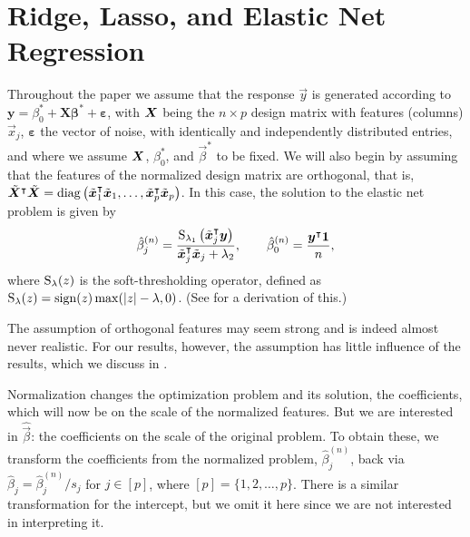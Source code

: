 \section{Ridge, Lasso, and Elastic Net Regression}%
\label{sec:theory}

Throughout the paper we assume that the response \(\vec{y}\) is generated according to
\(\bm{y} = \beta_0^* + \bm{X\beta}^* + \bm{\varepsilon}\), with \(\bm X\) being the \(n
\times p\) design matrix with features (columns) \(\vec x_j\), \(\bm{\varepsilon}\) the
vector of noise, with identically and independently distributed entries, and where we
assume \(\bm{X}\), \(\beta_0^*\), and \(\vec{\beta}^*\) to be fixed. We will also begin by
assuming that the features of the normalized design matrix are orthogonal, that is,
\(\tilde{\bm{X}}^\intercal \tilde{\bm{X}} = \operatorname{diag}\left(\tilde{\bm{x}}_1^\intercal
\tilde{\bm{x}}_1, \dots, \tilde{\bm{x}}_p^\intercal \tilde{\bm{x}}_p\right)\). In this
case, the solution to the elastic net problem is given by
%
\begin{equation}
  \label{eq:orthogonal-solution-normalized}
  \hat{\beta}^{(n)}_j = \frac{\operatorname{S}_{\lambda_1}\left(\tilde{\bm{x}}_j^\intercal \bm{y}\right)}{\tilde{\bm{x}}_j^\intercal \tilde{\bm{x}}_j + \lambda_2},
  \qquad
  \hat{\beta}_0^{(n)} = \frac{\bm{y}^\intercal \bm{1}}{n},
\end{equation}
%
where \(\operatorname{S}_\lambda(z)\) is the soft-thresholding operator, defined as \(\operatorname{S}_\lambda(z) =
\operatorname{sign}(z) \max(|z| - \lambda, 0)\). (See  for a derivation
of this.)

The assumption of orthogonal features may seem strong and is indeed almost never realistic.
For our results, however, the assumption has little influence of the results, which we
discuss in .

Normalization changes the optimization problem and its solution, the coefficients, which
will now be on the scale of the normalized features. But we are interested in
\(\hat{\vec{\beta}}\): the coefficients on the scale of the original problem. To obtain
these, we transform the coefficients from the normalized problem, \(\hat\beta^{(n)}_j\),
back via \(\hat\beta_j = \hat\beta^{(n)}_j/s_j\) for \(j \in [p]\), where \([p] =
\{1,2,\dots,p\}\). There is a similar transformation for the intercept, but we omit it here
since we are not interested in interpreting it.

